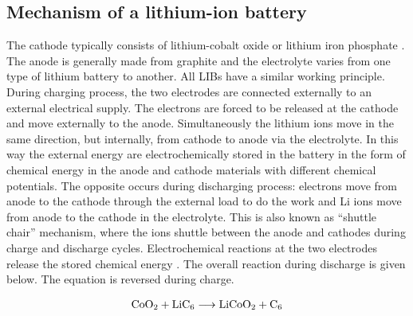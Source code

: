 \subsection*{Mechanism of a lithium-ion battery}
The cathode typically consists of lithium-cobalt oxide  or lithium iron phosphate . The anode is generally made from graphite and the electrolyte varies from one type of lithium battery to another. All LIBs have a similar working principle. During charging process, the two electrodes are connected externally to an external electrical supply. The electrons are forced to be released at the cathode and move externally to the anode. Simultaneously the lithium ions move in the same direction, but internally, from cathode to anode via the electrolyte. In this way the external energy are electrochemically stored in the battery in the form of chemical energy in the anode and cathode materials with different chemical potentials. The opposite occurs during discharging process: electrons move from anode to the cathode through the external load to do the work and Li ions move from anode to the cathode in the electrolyte. This is also known as \enquote{shuttle chair} mechanism, where the  ions shuttle between the anode and cathodes during charge and discharge cycles. Electrochemical reactions at the two electrodes release the stored chemical energy \cite{deng_li}. The overall reaction during discharge is given below. The equation is reversed during charge. 

\begin{align}
    \ce{CoO2} + \ce{LiC6} \longrightarrow \ce{LiCoO2} + \ce{C6}
\end{align}

\vspace{3mm}

